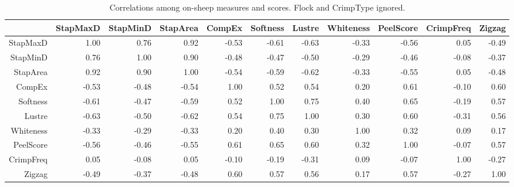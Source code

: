 \begin{landscape}
\begin{table}[ht]
\centering
\caption{Correlations among on-sheep measures and scores. Flock and CrimpType ignored.}
\label{tab:correl}
\begin{tabular}{rrrrrrrrrrr}
  \hline
 & StapMaxD & StapMinD & StapArea & CompEx & Softness & Lustre & Whiteness & PeelScore & CrimpFreq & Zigzag \\ 
  \hline
StapMaxD & 1.00 & 0.76 & 0.92 & -0.53 & -0.61 & -0.63 & -0.33 & -0.56 & 0.05 & -0.49 \\ 
  StapMinD & 0.76 & 1.00 & 0.90 & -0.48 & -0.47 & -0.50 & -0.29 & -0.46 & -0.08 & -0.37 \\ 
  StapArea & 0.92 & 0.90 & 1.00 & -0.54 & -0.59 & -0.62 & -0.33 & -0.55 & 0.05 & -0.48 \\ 
  CompEx & -0.53 & -0.48 & -0.54 & 1.00 & 0.52 & 0.54 & 0.20 & 0.61 & -0.10 & 0.60 \\ 
  Softness & -0.61 & -0.47 & -0.59 & 0.52 & 1.00 & 0.75 & 0.40 & 0.65 & -0.19 & 0.57 \\ 
  Lustre & -0.63 & -0.50 & -0.62 & 0.54 & 0.75 & 1.00 & 0.30 & 0.60 & -0.31 & 0.56 \\ 
  Whiteness & -0.33 & -0.29 & -0.33 & 0.20 & 0.40 & 0.30 & 1.00 & 0.32 & 0.09 & 0.17 \\ 
  PeelScore & -0.56 & -0.46 & -0.55 & 0.61 & 0.65 & 0.60 & 0.32 & 1.00 & -0.07 & 0.57 \\ 
  CrimpFreq & 0.05 & -0.08 & 0.05 & -0.10 & -0.19 & -0.31 & 0.09 & -0.07 & 1.00 & -0.27 \\ 
  Zigzag & -0.49 & -0.37 & -0.48 & 0.60 & 0.57 & 0.56 & 0.17 & 0.57 & -0.27 & 1.00 \\ 
   \hline
\end{tabular}
\end{table}
\end{landscape}
